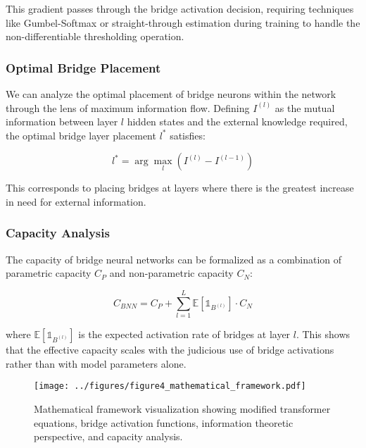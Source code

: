 \documentclass[9pt,a4paper,twocolumn,twoside]{tau-class/tau}
\begin{document}
    This gradient passes through the bridge activation decision, requiring techniques like Gumbel-Softmax or straight-through estimation during training to handle the non-differentiable thresholding operation.

\subsubsection{Optimal Bridge Placement}

    We can analyze the optimal placement of bridge neurons within the network through the lens of maximum information flow. Defining $I^{(l)}$ as the mutual information between layer $l$ hidden states and the external knowledge required, the optimal bridge layer placement $l^*$ satisfies:

    \begin{equation}
        l^* = \arg\max_l \left( I^{(l)} - I^{(l-1)} \right)
    \end{equation}

    This corresponds to placing bridges at layers where there is the greatest increase in need for external information.

\subsubsection{Capacity Analysis}

    The capacity of bridge neural networks can be formalized as a combination of parametric capacity $C_P$ and non-parametric capacity $C_N$:

    \begin{equation}
        C_{BNN} = C_P + \sum_{l=1}^{L} \mathbb{E}[\mathbb{1}_{B^{(l)}}] \cdot C_N
    \end{equation}

    where $\mathbb{E}[\mathbb{1}_{B^{(l)}}]$ is the expected activation rate of bridges at layer $l$. This shows that the effective capacity scales with the judicious use of bridge activations rather than with model parameters alone.

    \begin{figure}[h]
        \centering
        \texttt{[image: ../figures/figure4\_mathematical\_framework.pdf]}
        \caption{Mathematical framework visualization showing modified transformer equations, bridge activation functions, information theoretic perspective, and capacity analysis.}
        \label{fig:mathematical}
    \end{figure}
\end{document}
